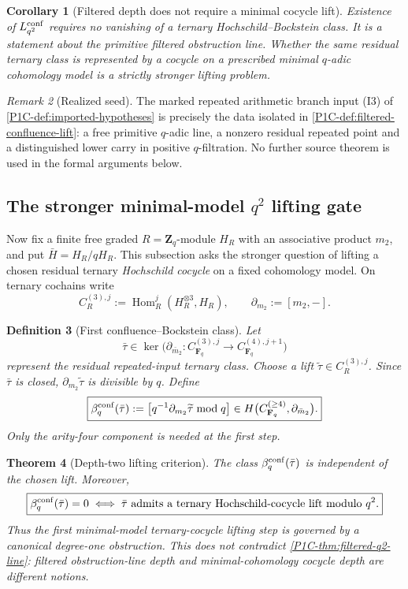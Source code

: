 \documentclass[11pt]{article}
\newtheorem{theorem}{Theorem}[section]
\newtheorem{corollary}[theorem]{Corollary}
\newtheorem{definition}[theorem]{Definition}
\theoremstyle{remark}
\newtheorem{remark}[theorem]{Remark}
\newcommand{\Z}{\mathbf Z}
\newcommand{\F}{\mathbf F}
\providecommand{\Hom}{\operatorname{Hom}}
\begin{document}
\begin{corollary}[Filtered depth does not require a minimal cocycle lift]\label{P1C-cor:filtered-vs-minimal}
Existence of $L^{\rm conf}_{q^2}$ requires no vanishing of a ternary Hochschild--Bockstein class.  It is a statement about the primitive filtered obstruction line.  Whether the same residual ternary class is represented by a cocycle on a prescribed minimal $q$-adic cohomology model is a strictly stronger lifting problem.
\end{corollary}

\begin{remark}[Realized seed]
The marked repeated arithmetic branch input (I3) of \cref{P1C-def:imported-hypotheses} is precisely the data isolated in \cref{P1C-def:filtered-confluence-lift}: a free primitive $q$-adic line, a nonzero residual repeated point and a distinguished lower carry in positive $q$-filtration.  No further source theorem is used in the formal arguments below.
\end{remark}

\subsection{The stronger minimal-model $q^2$ lifting gate}

Now fix a finite free graded $R=\Z_q$-module $H_R$ with an associative product $m_2$, and put $\bar H=H_R/qH_R$.  This subsection asks the stronger question of lifting a chosen residual ternary \emph{Hochschild cocycle} on a fixed cohomology model.  On ternary cochains write
\[
 C_R^{(3),j}:=\Hom_R^j(H_R^{\otimes3},H_R),
 \qquad
 \partial_{m_2}:=[m_2,-].
\]

\begin{definition}[First confluence--Bockstein class]\label{P1C-def:first-confluence-bockstein}
Let
\[
 \bar\tau\in\ker\bigl(
 \partial_{\bar m_2}:C_{\F_q}^{(3),j}\to C_{\F_q}^{(4),j+1}
 \bigr)
\]
represent the residual repeated-input ternary class.  Choose a lift $\widetilde\tau\in C_R^{(3),j}$.  Since $\bar\tau$ is closed, $\partial_{m_2}\widetilde\tau$ is divisible by $q$.  Define
\[
 \boxed{
 \beta_q^{\rm conf}(\bar\tau)
 :=\left[q^{-1}\partial_{m_2}\widetilde\tau\bmod q\right]
 \in H\bigl(C_{\F_q}^{(\ge4)},\partial_{\bar m_2}\bigr).}
\]
Only the arity-four component is needed at the first step.
\end{definition}

\begin{theorem}[Depth-two lifting criterion]\label{P1C-thm:depth-two-lifting-criterion}
The class $\beta_q^{\rm conf}(\bar\tau)$ is independent of the chosen lift.  Moreover,
\[
 \boxed{
 \beta_q^{\rm conf}(\bar\tau)=0
 \iff
 \bar\tau\text{ admits a ternary Hochschild-cocycle lift modulo }q^2.}
\]
Thus the first \emph{minimal-model ternary-cocycle} lifting step is governed by a canonical degree-one obstruction.  This does not contradict \cref{P1C-thm:filtered-q2-line}: filtered obstruction-line depth and minimal-cohomology cocycle depth are different notions.
\end{theorem}
\end{document}
